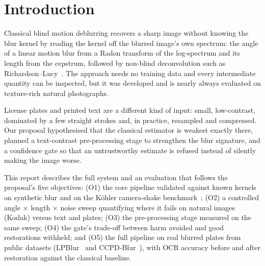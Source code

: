 \section{Introduction}

Classical blind motion deblurring recovers a sharp image without knowing the blur kernel by
reading the kernel off the blurred image's own spectrum: the angle of a linear motion blur from a
Radon transform of the log-spectrum and its length from the cepstrum, followed by non-blind
deconvolution such as Richardson--Lucy~\cite{richardson1972,lucy1974,cannon1976,moghaddam2007,oliveira2007}.
The approach needs no training data and every intermediate quantity can be inspected, but it was
developed and is nearly always evaluated on texture-rich natural photographs.

License plates and printed text are a different kind of input: small, low-contrast, dominated by a
few straight strokes and, in practice, resampled and compressed. Our proposal hypothesised that the
classical estimator is weakest exactly there, planned a text-contrast pre-processing stage to
strengthen the blur signature, and a confidence gate so that an untrustworthy estimate is refused
instead of silently making the image worse.

This report describes the full system and an evaluation that follows the proposal's five
objectives: (O1) the core pipeline validated against known kernels on synthetic blur and on the
K\"ohler camera-shake benchmark~\cite{kohler2012}; (O2) a controlled angle $\times$ length $\times$
noise sweep quantifying where it fails on natural images (Kodak) versus text and plates;
(O3) the pre-processing stage measured on the same sweep; (O4) the gate's trade-off between
harm avoided and good restorations withheld; and (O5) the full pipeline on real blurred plates from
public datasets (LPBlur~\cite{lpblur2024} and CCPD-Blur~\cite{ccpd2018}), with OCR accuracy before
and after restoration against the classical baseline.


